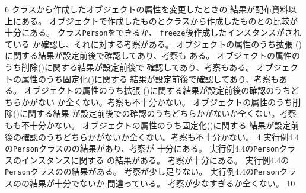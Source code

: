\ProblemNN{



\Newpage


}
{{}{6}{
 {クラスから作成したオブジェクトの属性を変更したときの
 結果が配布資料以上にある。}
 {オブジェクトで作成したものとクラスから作成したものとの比較が十分にある。}
 {クラス\texttt{Person}をできるか、
         \texttt{freeze}後作成したインスタンスがされている
 か確認し、それに対する考察がある。}
 }
 {
 {オブジェクトの属性のうち\newline 拡張
 ()に関する結果が設定前後で確認してあり、考察も
 ある。}
 {オブジェクトの属性のうち削除()に関する結果が設定前後で
 確認してあり、考察もある。}
 {オブジェクトの属性のうち固定化()に関する
 結果が設定前後で確認してあり、考察もある。}
 }
 {
 {オブジェクトの属性のうち\newline 拡張
 ()に関する結果が設定前後の確認のうちどちらかがない
 か全くない。考察も不十分かない。}
 {オブジェクトの属性のうち削除()に関する結果
 が設定前後での確認のうちどちらかがないか全くない。考察もも不十分かない。}
 {オブジェクトの属性のうち固定化()に関する
 結果が設定前後の確認のうちどちらかがないか全くない。考察も不十分かない。}
 }
{}{4}{
 {実行例4.4の\texttt{Person}クラスのの結果があり、考察が
 十分にある。}
 {実行例4.4の\texttt{Person}クラスのインスタンスに関する
 の結果がある。}
 {考察が十分にある。}
 }
 {
 {実行例4.4の\texttt{Person}クラスのの結果がある。}
 {考察が少し足りない。}
 }
 {
 {実行例4.4の\texttt{Person}クラスのの結果が十分でないか
 間違っている。}
 {考察が少なすぎるか全くない。}
 }
 {}{10}{
}}
